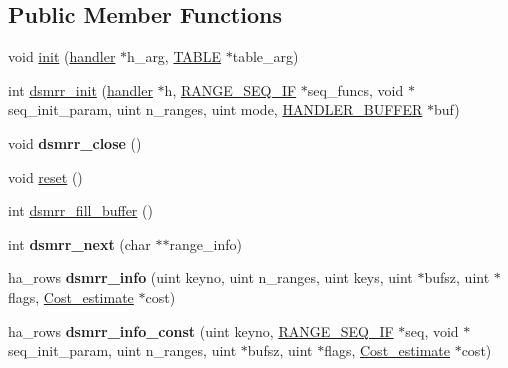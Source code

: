 \subsection*{Public Member Functions}
\begin{DoxyCompactItemize}
\item 
void \mbox{\hyperlink{classDsMrr__impl_a63da49f2511507a66241265e90897775}{init}} (\mbox{\hyperlink{classhandler}{handler}} $\ast$h\+\_\+arg, \mbox{\hyperlink{structTABLE}{T\+A\+B\+LE}} $\ast$table\+\_\+arg)
\item 
int \mbox{\hyperlink{classDsMrr__impl_ade7283d68a19de82fd19ad836ac10506}{dsmrr\+\_\+init}} (\mbox{\hyperlink{classhandler}{handler}} $\ast$h, \mbox{\hyperlink{structst__range__seq__if}{R\+A\+N\+G\+E\+\_\+\+S\+E\+Q\+\_\+\+IF}} $\ast$seq\+\_\+funcs, void $\ast$seq\+\_\+init\+\_\+param, uint n\+\_\+ranges, uint mode, \mbox{\hyperlink{structst__handler__buffer}{H\+A\+N\+D\+L\+E\+R\+\_\+\+B\+U\+F\+F\+ER}} $\ast$buf)
\item 
\mbox{\label{classDsMrr__impl_a37d8684f4e71bf4b0b4f064546184417}} 
void {\bfseries dsmrr\+\_\+close} ()
\item 
void \mbox{\hyperlink{classDsMrr__impl_a186174fdee0ea701012e58c55a1e5618}{reset}} ()
\item 
int \mbox{\hyperlink{classDsMrr__impl_a444c0116a9c9b9eefb73195e8ad5c3e6}{dsmrr\+\_\+fill\+\_\+buffer}} ()
\item 
\mbox{\label{classDsMrr__impl_afcc0a1f4f99e95737581fae0161b2527}} 
int {\bfseries dsmrr\+\_\+next} (char $\ast$$\ast$range\+\_\+info)
\item 
\mbox{\label{classDsMrr__impl_a2b61662dc18bf171f35e679c4c87eb64}} 
ha\+\_\+rows {\bfseries dsmrr\+\_\+info} (uint keyno, uint n\+\_\+ranges, uint keys, uint $\ast$bufsz, uint $\ast$flags, \mbox{\hyperlink{classCost__estimate}{Cost\+\_\+estimate}} $\ast$cost)
\item 
\mbox{\label{classDsMrr__impl_a37a15cc5cafd27df60f13cc3b39c7476}} 
ha\+\_\+rows {\bfseries dsmrr\+\_\+info\+\_\+const} (uint keyno, \mbox{\hyperlink{structst__range__seq__if}{R\+A\+N\+G\+E\+\_\+\+S\+E\+Q\+\_\+\+IF}} $\ast$seq, void $\ast$seq\+\_\+init\+\_\+param, uint n\+\_\+ranges, uint $\ast$bufsz, uint $\ast$flags, \mbox{\hyperlink{classCost__estimate}{Cost\+\_\+estimate}} $\ast$cost)
\end{DoxyCompactItemize}
